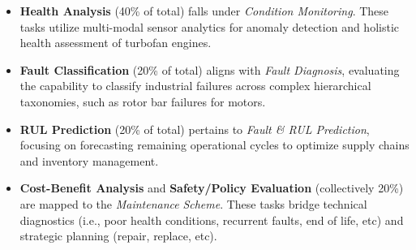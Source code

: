\documentclass[sigconf,review]{acmart}
\begin{document}
\begin{itemize} \item \textbf{Health Analysis} (40\% of total) falls under \textit{Condition Monitoring}. These tasks utilize multi-modal sensor analytics for anomaly detection and holistic health assessment of turbofan engines.

\item \textbf{Fault Classification} (20\% of total) aligns with \textit{Fault Diagnosis}, evaluating the capability to classify industrial failures across complex hierarchical taxonomies, such as rotor bar failures for motors. 

\item \textbf{RUL Prediction} (20\% of total) pertains to \textit{Fault \& RUL Prediction}, focusing on forecasting remaining operational cycles to optimize supply chains and inventory management. 

\item \textbf{Cost-Benefit Analysis} and \textbf{Safety/Policy Evaluation} (collectively 20\%) are mapped to the \textit{Maintenance} \textit{Scheme}. These tasks bridge technical diagnostics (i.e., poor health conditions, recurrent faults, end of life, etc) and strategic planning (repair, replace, etc). 
\end{itemize}

\end{document}
